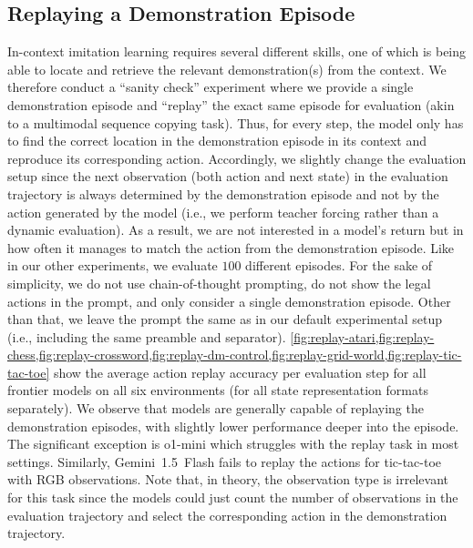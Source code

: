 \documentclass{article}
\newcommand{\ie}{i.e., }
\newcommand{\flash}{Gemini~1.5~Flash}
\newcommand{\mini}{o1-mini}
\begin{document}
\subsection{Replaying a Demonstration Episode}
\label{app:additional-results:replay}
In-context imitation learning requires several different skills, one of which is being able to locate and retrieve the relevant demonstration(s) from the context.
We therefore conduct a ``sanity check'' experiment where we provide a single demonstration episode and ``replay'' the exact same episode for evaluation (akin to a multimodal sequence copying task).
Thus, for every step, the model only has to find the correct location in the demonstration episode in its context and reproduce its corresponding action.
Accordingly, we slightly change the evaluation setup since the next observation (both action and next state) in the evaluation trajectory is always determined by the demonstration episode and not by the action generated by the model (\ie we perform teacher forcing rather than a dynamic evaluation).
As a result, we are not interested in a model's return but in how often it manages to match the action from the demonstration episode.
Like in our other experiments, we evaluate $100$ different episodes.
For the sake of simplicity, we do not use chain-of-thought prompting, do not show the legal actions in the prompt, and only consider a single demonstration episode.
Other than that, we leave the prompt the same as in our default experimental setup (\ie including the same preamble and separator).
\cref{fig:replay-atari,fig:replay-chess,fig:replay-crossword,fig:replay-dm-control,fig:replay-grid-world,fig:replay-tic-tac-toe} show the average action replay accuracy per evaluation step for all frontier models on all six environments (for all state representation formats separately).
We observe that models are generally capable of replaying the demonstration episodes, with slightly lower performance deeper into the episode.
The significant exception is \mini{} which struggles with the replay task in most settings.
Similarly, \flash{} fails to replay the actions for tic-tac-toe with RGB observations.
Note that, in theory, the observation type is irrelevant for this task since the models could just count the number of observations in the evaluation trajectory and select the corresponding action in the demonstration trajectory.
\end{document}

